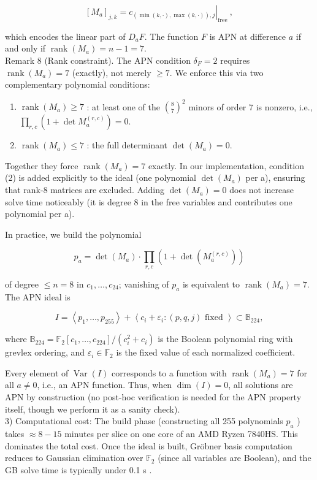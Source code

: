 \documentclass[10pt]{article}
\begin{document}
$$
\left[M_{a}\right]_{j, k}=\left.c_{(\min (k, \cdot), \max (k, \cdot)), j}\right|_{\text {free }},
$$

which encodes the linear part of $D_{a} F$. The function $F$ is APN at difference $a$ if and only if $\operatorname{rank}\left(M_{a}\right)=n-1=7$.\\
Remark 8 (Rank constraint). The APN condition $\delta_{F}=2$ requires $\operatorname{rank}\left(M_{a}\right)=7$ (exactly), not merely $\geq 7$. We enforce this via two complementary polynomial conditions:

\begin{enumerate}
  \item $\operatorname{rank}\left(M_{a}\right) \geq 7$ : at least one of the $\binom{8}{7}^{2}$ minors of order 7 is nonzero, i.e., $\prod_{r, c}\left(1+\operatorname{det} M_{a}^{(r, c)}\right)=0$.
  \item $\operatorname{rank}\left(M_{a}\right) \leq 7$ : the full determinant $\operatorname{det}\left(M_{a}\right)=0$.
\end{enumerate}

Together they force $\operatorname{rank}\left(M_{a}\right)=7$ exactly. In our implementation, condition (2) is added explicitly to the ideal (one polynomial $\operatorname{det}\left(M_{a}\right)$ per a), ensuring that rank-8 matrices are excluded. Adding $\operatorname{det}\left(M_{a}\right)=0$ does not increase solve time noticeably (it is degree 8 in the free variables and contributes one polynomial per a).

In practice, we build the polynomial

$$
p_{a}=\operatorname{det}\left(M_{a}\right) \cdot \prod_{r, c}\left(1+\operatorname{det}\left(M_{a}^{(r, c)}\right)\right)
$$

of degree $\leq n=8$ in $c_{1}, \ldots, c_{24}$; vanishing of $p_{a}$ is equivalent to $\operatorname{rank}\left(M_{a}\right)=7$.\\
The APN ideal is

$$
I=\left\langle p_{1}, \ldots, p_{255}\right\rangle+\left\langle c_{i}+\varepsilon_{i}:(p, q, j) \text { fixed }\right\rangle \subset \mathbb{B}_{224},
$$

where $\mathbb{B}_{224}=\mathbb{F}_{2}\left[c_{1}, \ldots, c_{224}\right] /\left(c_{i}^{2}+c_{i}\right)$ is the Boolean polynomial ring with grevlex ordering, and $\varepsilon_{i} \in \mathbb{F}_{2}$ is the fixed value of each normalized coefficient.

Every element of $\operatorname{Var}(I)$ corresponds to a function with $\operatorname{rank}\left(M_{a}\right)=7$ for all $a \neq 0$, i.e., an APN function. Thus, when $\operatorname{dim}(I)=0$, all solutions are APN by construction (no post-hoc verification is needed for the APN property itself, though we perform it as a sanity check).\\
3) Computational cost: The build phase (constructing all 255 polynomials $p_{a}$ ) takes $\approx 8-15$ minutes per slice on one core of an AMD Ryzen 7840HS. This dominates the total cost. Once the ideal is built, Gröbner basis computation reduces to Gaussian elimination over $\mathbb{F}_{2}$ (since all variables are Boolean), and the GB solve time is typically under 0.1 s .
\end{document}
